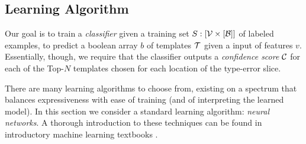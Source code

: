 



\subsection{Learning Algorithm}
\label{sec:models}
\lstDeleteShortInline{|} %

Our goal is to train a \emph{classifier} given a training set $S : [\mathcal{V}
\times [\mathcal{B}]]$ of labeled examples, to predict a boolean array $b$ of
templates $\mathcal{T}$ given a input of features $v$. Essentially, though, we require
that the classifier outputs a \emph{confidence score} $\mathcal{C}$ for each of the
Top-$N$ templates chosen for each location of the type-error slice.

There are many learning algorithms to choose from, existing on a spectrum that
balances expressiveness with ease of training (and of interpreting the learned
model). In this section we consider a standard learning algorithm: \emph{neural
networks}. A thorough introduction to these techniques can be found in
introductory machine learning textbooks \citep[\eg][]{Hastie2009-bn}.


